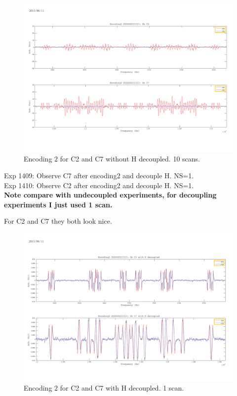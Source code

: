 \begin{figure}[htb]
\begin{center}
\includegraphics[width=\columnwidth]{Encoding2_without_decouple.pdf}
\end{center}
\setlength{\abovecaptionskip}{-0.35cm}
\caption{\footnotesize{Encoding 2 for C2 and C7 without H decoupled. 10 scans.}}\label{1407and1408}
\end{figure}

\clearpage
Exp 1409: Observe C7 after encoding2 and decouple H. NS=1.\\
Exp 1410: Observe C2 after encoding2 and decouple H. NS=1.\\
\textbf{Note compare with undecoupled experiments, for decoupling experiments I just used 1 scan.}

For C2 and C7 they both look nice.

\begin{figure}[htb]
\begin{center}
\includegraphics[width=\columnwidth]{Encoding2_with_decouple.pdf}
\end{center}
\setlength{\abovecaptionskip}{-0.35cm}
\caption{\footnotesize{Encoding 2 for C2 and C7 with H decoupled. 1 scan.}}\label{1409and1410}
\end{figure}

